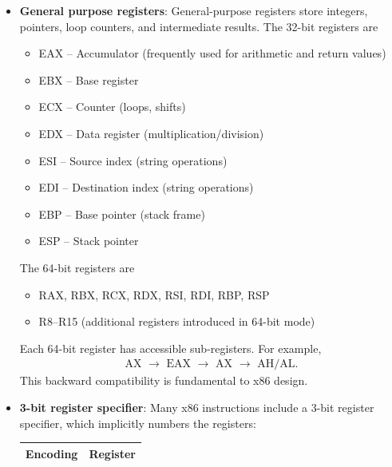 \documentclass{report}
\begin{document}
    \pagebreak 
    \begin{itemize}
        \item \textbf{General purpose registers}: General-purpose registers store integers, pointers, loop counters, and intermediate results.
            \bigbreak \noindent 
            The 32-bit registers are 
            \begin{itemize}
                \item EAX – Accumulator (frequently used for arithmetic and return values)
                \item EBX – Base register
                \item ECX – Counter (loops, shifts)
                \item EDX – Data register (multiplication/division)
                \item ESI – Source index (string operations)
                \item EDI – Destination index (string operations)
                \item EBP – Base pointer (stack frame)
                \item ESP – Stack pointer
            \end{itemize}
            The 64-bit registers are
            \begin{itemize}
                \item RAX, RBX, RCX, RDX, RSI, RDI, RBP, RSP
                \item R8–R15 (additional registers introduced in 64-bit mode)
            \end{itemize}
            Each 64-bit register has accessible sub-registers. For example, 
            \begin{align*}
                \text{AX } \to \text{ EAX } \to \text{ AX }\to \text{ AH/AL}
            .\end{align*}
            This backward compatibility is fundamental to x86 design.
        \item \textbf{3-bit register specifier}: Many x86 instructions include a 3-bit register specifier, which implicitly numbers the registers:
            \begin{center}
                \begin{tabularx}{\textwidth}{@{}XX@{}}
                    \toprule
                    \textbf{Encoding}&	\textbf{Register} \\
                    \midrule

\end{tabularx}
\end{center}
\end{itemize}
\end{document}
